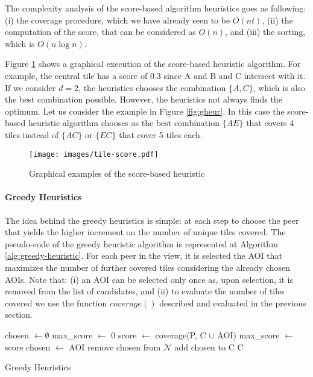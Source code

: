 \documentclass[final,10pt,a5paper]{phdimt}
\theoremstyle{definition}
\begin{document}
The complexity analysis of the score-based algorithm heuristics goes as following: 
(i) the coverage procedure, which we have already seen to be $O(nt)$, 
(ii) the computation of the score, that can be considered as $O(n)$, 
and (iii) the sorting, which is $O(n \log n)$. 



Figure \ref{graph:score} shows a graphical execution of the score-based heuristic algorithm. 
For example, the central tile has a score of 0.3 since A and B and C intersect with it. If we consider $d=2$, the heuristics chooses the combination $\{A,C\}$, which is also the best combination possible. However, the heuristics not always finds the optimum. Let us consider the example in Figure \ref{fig:gheur}. In this case the score-based heuristic algorithm chooses as the best combination $\{AE\}$ that covers 4 tiles instead of $\{AC\}$ or $\{EC\}$ that cover 5 tiles each.

\begin{figure}
\centering
\texttt{[image: images/tile-score.pdf]}
\caption{Graphical examples of the score-based heuristic}\label{graph:score}
\end{figure}



\paragraph{Greedy Heuristics}
The idea behind the greedy heuristics is simple: at each step to choose the peer that yields the higher increment on the number of unique tiles covered. The pseudo-code of the greedy heuristic algorithm is represented at Algorithm \ref{alg:greedy-heuristic}.
For each peer in the view, it is selected the AOI that maximizes the number of further covered tiles considering the already chosen AOIs. Note that: (i) an AOI can be selected only once as, upon selection, it is removed from the list of candidates, and (ii) to evaluate the number of tiles covered we use the function $coverage()$ described and evaluated in the previous section. 

\begin{algorithm}[tbh]


\BlankLine

{\label{greedy:outer}
  chosen $\leftarrow \emptyset$\;
  max\_score $\leftarrow$ 0\;
  {\label{greedy:inner}
    score $\leftarrow$ coverage(P, C $\cup$ AOI)\;
    {
       max\_score $\leftarrow$ score\;
       chosen $\leftarrow$ AOI\;
    }
  }
  remove chosen from $\mathscr{N}$\;
  add chosen to C\;
}
\Return C\;
\caption{Greedy Heuristics}\label{alg:greedy-heuristic}
\end{algorithm} 
\end{document}
